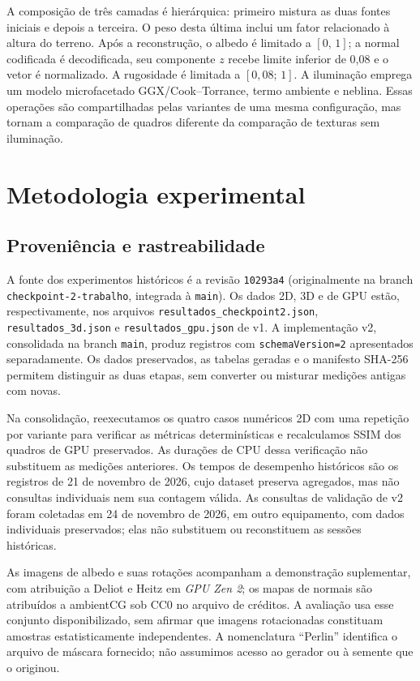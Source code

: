 A composição de três camadas é hierárquica: primeiro mistura as duas fontes iniciais e depois a terceira. O peso desta última inclui um fator relacionado à altura do terreno. Após a reconstrução, o albedo é limitado a $[0,\,1]$; a normal codificada é decodificada, seu componente $z$ recebe limite inferior de 0,08 e o vetor é normalizado. A rugosidade é limitada a $[0{,}08;\,1]$. A iluminação emprega um modelo microfacetado GGX/Cook--Torrance, termo ambiente e neblina. Essas operações são compartilhadas pelas variantes de uma mesma configuração, mas tornam a comparação de quadros diferente da comparação de texturas sem iluminação.

\section{Metodologia experimental}
\subsection{Proveniência e rastreabilidade}
A fonte dos experimentos históricos é a revisão \texttt{10293a4} (originalmente na branch \texttt{checkpoint-2-trabalho}, integrada à \texttt{main}). Os dados 2D, 3D e de GPU estão, respectivamente, nos arquivos \texttt{resultados\_checkpoint2.json}, \texttt{resultados\_3d.json} e \texttt{resultados\_gpu.json} de v1. A implementação v2, consolidada na branch \texttt{main}, produz registros com \texttt{schemaVersion=2} apresentados separadamente. Os dados preservados, as tabelas geradas e o manifesto SHA-256 permitem distinguir as duas etapas, sem converter ou misturar medições antigas com novas.

Na consolidação, reexecutamos os quatro casos numéricos 2D com uma repetição por variante para verificar as métricas determinísticas e recalculamos SSIM dos quadros de GPU preservados. As durações de CPU dessa verificação não substituem as medições anteriores. Os tempos de desempenho históricos são os registros de 21 de novembro de 2026, cujo dataset preserva agregados, mas não consultas individuais nem sua contagem válida. As consultas de validação de v2 foram coletadas em 24 de novembro de 2026, em outro equipamento, com dados individuais preservados; elas não substituem ou reconstituem as sessões históricas.

As imagens de albedo e suas rotações acompanham a demonstração suplementar, com atribuição a Deliot e Heitz em \emph{GPU Zen 2}; os mapas de normais são atribuídos a ambientCG sob CC0 no arquivo de créditos. A avaliação usa esse conjunto disponibilizado, sem afirmar que imagens rotacionadas constituam amostras estatisticamente independentes. A nomenclatura ``Perlin'' identifica o arquivo de máscara fornecido; não assumimos acesso ao gerador ou à semente que o originou.

